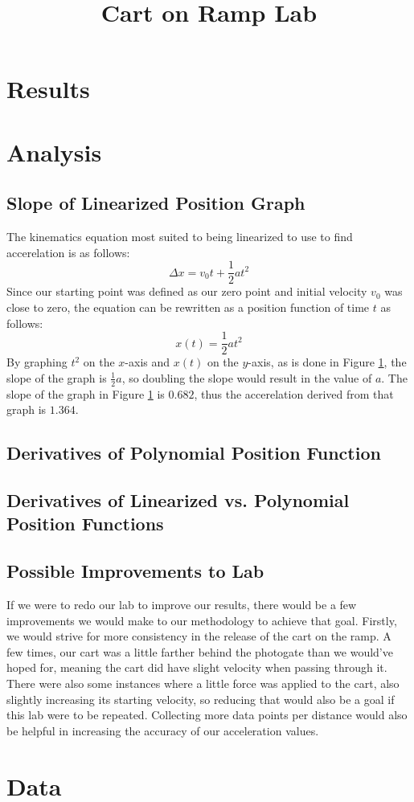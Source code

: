 \documentclass{article}
\title{Cart on Ramp Lab}
\begin{document}
\section{Results}
\begin{figure}
    \label{fig:linear}
\end{figure}
\section{Analysis}
\subsection{Slope of Linearized Position Graph}
The kinematics equation most suited to being linearized to use to find accerelation is as follows:
\[\Delta x = v_0t + \frac{1}{2}at^2\]
Since our starting point was defined as our zero point and initial velocity $v_0$ was close to zero, the equation can be rewritten as a position function of time $t$ as follows:
\[x(t) = \frac{1}{2}at^2\]
By graphing $t^2$ on the $x$-axis and $x(t)$ on the $y$-axis, as is done in Figure \ref{fig:linear}, the slope of the graph is $\frac{1}{2}a$, so doubling the slope would result in the value of $a$. The slope of the graph in Figure \ref{fig:linear} is $0.682$, thus the accerelation derived from that graph is $1.364$.

\subsection{Derivatives of Polynomial Position Function}
\subsection{Derivatives of Linearized vs. Polynomial Position Functions}

\subsection{Possible Improvements to Lab}
If we were to redo our lab to improve our results, there would be a few improvements we would make to our methodology to achieve that goal. Firstly, we would strive for more consistency in the release of the cart on the ramp. A few times, our cart was a little farther behind the photogate than we would've hoped for, meaning the cart did have slight velocity when passing through it. There were also some instances where a little force was applied to the cart, also slightly increasing its starting velocity, so reducing that would also be a goal if this lab were to be repeated. Collecting more data points per distance would also be helpful in increasing the accuracy of our acceleration values.


\appendix
\section{Data}
\end{document}
